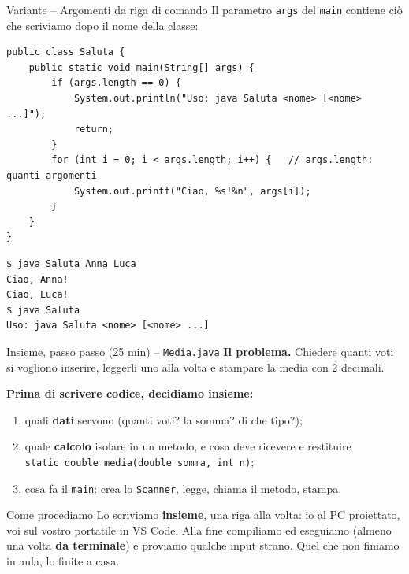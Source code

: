 \documentclass[10pt,aspectratio=169]{beamer}
\begin{document}
\begin{frame}[fragile]{Variante -- Argomenti da riga di comando}
Il parametro \texttt{args} del \texttt{main} contiene ciò che scriviamo dopo il nome della classe:
\begin{lstlisting}
public class Saluta {
    public static void main(String[] args) {
        if (args.length == 0) {
            System.out.println("Uso: java Saluta <nome> [<nome> ...]");
            return;
        }
        for (int i = 0; i < args.length; i++) {   // args.length: quanti argomenti
            System.out.printf("Ciao, %s!%n", args[i]);
        }
    }
}
\end{lstlisting}
\begin{lstlisting}[style=shell]
$ java Saluta Anna Luca
Ciao, Anna!
Ciao, Luca!
$ java Saluta
Uso: java Saluta <nome> [<nome> ...]
\end{lstlisting}
\end{frame}

\begin{frame}[fragile]{Insieme, passo passo (25 min) -- \texttt{Media.java}}
\textbf{Il problema.} Chiedere quanti voti si vogliono inserire, leggerli uno alla volta e stampare la media con 2 decimali.

\vspace{0.3cm}
\textbf{Prima di scrivere codice, decidiamo insieme:}
\begin{enumerate}\itemsep=3pt
    \item quali \textbf{dati} servono (quanti voti? la somma? di che tipo?);
    \item quale \textbf{calcolo} isolare in un metodo, e cosa deve ricevere e restituire\\
          \small \textrightarrow{} \texttt{static double media(double somma, int n)}\normalsize;
    \item cosa fa il \texttt{main}: crea lo \texttt{Scanner}, legge, chiama il metodo, stampa.
\end{enumerate}

\vspace{0.3cm}
\begin{block}{Come procediamo}
Lo scriviamo \textbf{insieme}, una riga alla volta: io al PC proiettato, voi sul vostro portatile in VS Code. Alla fine compiliamo ed eseguiamo (almeno una volta \textbf{da terminale}) e proviamo qualche input strano. Quel che non finiamo in aula, lo finite a casa.
\end{block}
\end{frame}
\end{document}
